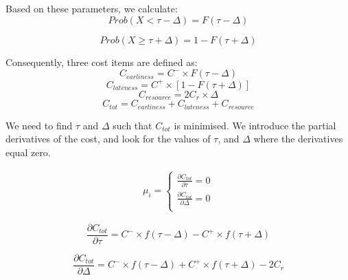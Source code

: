 Based on these parameters, we calculate:
\begin{equation}
    Prob(X<\tau-\Delta)=F(\tau-\Delta)
\end{equation}

\begin{equation}
   Prob(X\geq \tau +\Delta)=1 - F(\tau+\Delta)
\end{equation}

Consequently, three cost items are defined as:
\begin{equation}
   C_{earliness}=C^{-}\times F(\tau-\Delta)
\end{equation}
\begin{equation}
   C_{lateness}=C^{+}\times[1-F(\tau+\Delta)]
\end{equation}
\begin{equation}
   C_{resource}={2C}_r\times \Delta
\end{equation}
\begin{equation}
   C_{tot}=C_{earliness}+C_{lateness}+C_{resource}
\end{equation}

We need to find $\tau$ and $\Delta$ such that $C_{tot}$ is minimised. We introduce the partial derivatives of the cost, and look for the values of $\tau$, and $\Delta$ where the derivatives equal zero.

\begin{equation}
   \begin{split}
   \mu_{i}=\left\{
                \begin{array}{ll}
                  \frac{\partial C_{tot}}{\partial\tau}=0 \\
                  \frac{\partial C_{tot}}{\partial\Delta}=0 \\
                \end{array}
              \right.
   \end{split}
\end{equation}

\begin{equation}
    \frac{\partial C_{tot}}{\partial\tau}=C^{-}\times f(\tau-\Delta)-C^{+}\times f(\tau+\Delta)
    \label{eqPartialDerivativeTau}
\end{equation}

\begin{equation}
    \frac{\partial C_{tot}}{\partial\Delta}= C^{-}\times f(\tau- \Delta)+C^{+} \times f(\tau+\Delta)-2C_r
    \label{eqPartialDerivativeDelta}
\end{equation}

